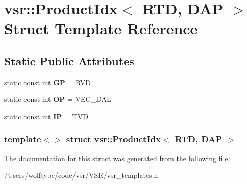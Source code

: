 \hypertarget{structvsr_1_1_product_idx_3_01_r_t_d_00_01_d_a_p_01_4}{\section{vsr\-:\-:Product\-Idx$<$ R\-T\-D, D\-A\-P $>$ Struct Template Reference}
\label{structvsr_1_1_product_idx_3_01_r_t_d_00_01_d_a_p_01_4}
}
\subsection*{Static Public Attributes}
\begin{DoxyCompactItemize}
\item 
\hypertarget{structvsr_1_1_product_idx_3_01_r_t_d_00_01_d_a_p_01_4_aaa607bcbbf738bbbec1cb557957240c7}{static const int {\bfseries G\-P} = R\-V\-D}\label{structvsr_1_1_product_idx_3_01_r_t_d_00_01_d_a_p_01_4_aaa607bcbbf738bbbec1cb557957240c7}

\item 
\hypertarget{structvsr_1_1_product_idx_3_01_r_t_d_00_01_d_a_p_01_4_a898e7d81a021782dc571260d6b3afb5d}{static const int {\bfseries O\-P} = V\-E\-C\-\_\-\-D\-A\-L}\label{structvsr_1_1_product_idx_3_01_r_t_d_00_01_d_a_p_01_4_a898e7d81a021782dc571260d6b3afb5d}

\item 
\hypertarget{structvsr_1_1_product_idx_3_01_r_t_d_00_01_d_a_p_01_4_a115dd2e6d95b75bc111c5333e4b9e26b}{static const int {\bfseries I\-P} = T\-V\-D}\label{structvsr_1_1_product_idx_3_01_r_t_d_00_01_d_a_p_01_4_a115dd2e6d95b75bc111c5333e4b9e26b}

\end{DoxyCompactItemize}
\subsubsection*{template$<$$>$ struct vsr\-::\-Product\-Idx$<$ R\-T\-D, D\-A\-P $>$}



The documentation for this struct was generated from the following file\-:\begin{DoxyCompactItemize}
\item 
/\-Users/wolftype/code/vsr/\-V\-S\-R/vsr\-\_\-templates.\-h\end{DoxyCompactItemize}
